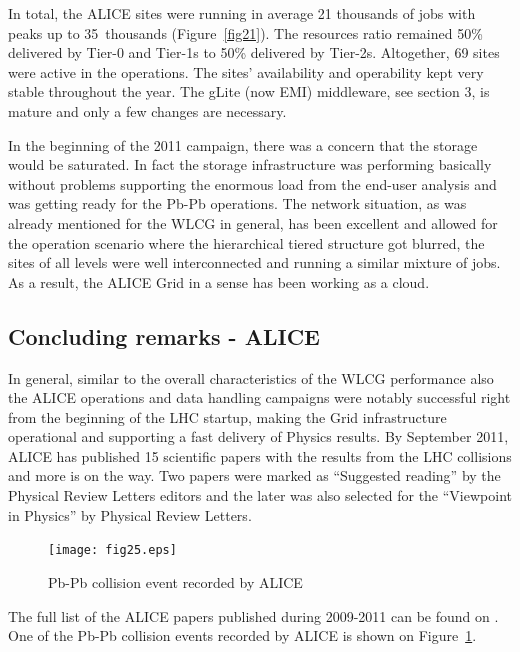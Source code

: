 In total, the ALICE sites were running in average 21 thousands of
jobs with peaks up to 35~thousands (Figure~\ref{fig21}). The
resources ratio remained 50\% delivered by Tier-0 and Tier-1s to
50\% delivered by Tier-2s. Altogether, 69 sites were active in the
operations. The sites' availability and operability kept very stable
throughout the year. The gLite (now EMI) middleware, see section 3,
is mature and only a few changes are necessary. 

In the beginning of the 2011 campaign, there was a concern that the
storage would be saturated. In fact the storage infrastructure was
performing basically without problems supporting the enormous load
from the end-user analysis and was getting ready for the Pb-Pb
operations. The network situation, as was already mentioned for the
WLCG in general, has been excellent and allowed for the operation
scenario where the hierarchical tiered structure got blurred, the
sites of all levels were well interconnected and running a similar
mixture of jobs. As a result, the ALICE Grid in a sense has been
working as a cloud.

\subsection{Concluding remarks - ALICE}
%
In general, similar to the overall characteristics of the WLCG
performance also the ALICE operations and data handling campaigns
were notably successful right from the beginning of the LHC startup,
making the Grid infrastructure operational and supporting a fast
delivery of Physics results. By September 2011, ALICE has published
15 scientific papers with the results from the LHC collisions and
more is on the way. Two papers \cite{alice_mul, alice_pbpb} were marked as ``Suggested
reading'' by the Physical Review Letters editors and the later was
also  selected for the ``Viewpoint in Physics'' by Physical Review
Letters.


\begin{figure}[htb] %
\centering
\texttt{[image: fig25.eps]} %
\caption{Pb-Pb collision event recorded by ALICE}\label{fig25}
\end{figure}



The full list of the ALICE papers published during 2009-2011 can be
found on \cite{alice_papers}. One of the Pb-Pb collision events recorded by ALICE is
shown on Figure~\ref{fig25}.
